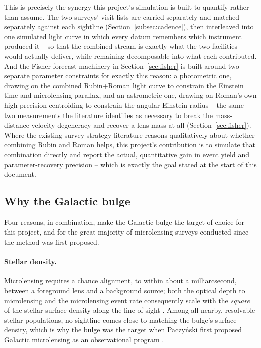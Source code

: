 \documentclass[english,10pt,a4paper]{article}
\begin{document}
	This is precisely the synergy this project's simulation is built to quantify rather than assume. The two surveys' visit lists are carried separately and matched separately against each sightline (Section~\ref{subsec:cadence}), then interleaved into one simulated light curve in which every datum remembers which instrument produced it -- so that the combined stream is exactly what the two facilities would actually deliver, while remaining decomposable into what each contributed. And the Fisher-forecast machinery in Section~\ref{sec:fisher} is built around two separate parameter constraints for exactly this reason: a photometric one, drawing on the combined Rubin+Roman light curve to constrain the Einstein time and microlensing parallax, and an astrometric one, drawing on Roman's own high-precision centroiding to constrain the angular Einstein radius -- the same two measurements the literature identifies as necessary to break the mass-distance-velocity degeneracy and recover a lens mass at all (Section~\ref{sec:fisher}). Where the existing survey-strategy literature reasons qualitatively about whether combining Rubin and Roman helps, this project's contribution is to simulate that combination directly and report the actual, quantitative gain in event yield and parameter-recovery precision -- which is exactly the goal stated at the start of this document.
	
	\subsection{Why the Galactic bulge}
	\label{subsec:why_bulge}
	
	Four reasons, in combination, make the Galactic bulge the target of choice for this project, and for the great majority of microlensing surveys conducted since the method was first proposed.
	
	\paragraph{Stellar density.} Microlensing requires a chance alignment, to within about a milliarcsecond, between a foreground lens and a background source; both the optical depth to microlensing and the microlensing event rate consequently scale with the \emph{square} of the stellar surface density along the line of sight \cite{Terry2026HST}. Among all nearby, resolvable stellar populations, no sightline comes close to matching the bulge's surface density, which is why the bulge was the target when Paczy\'nski first proposed Galactic microlensing as an observational program \cite{Paczynski1991}.
	
\end{document}
